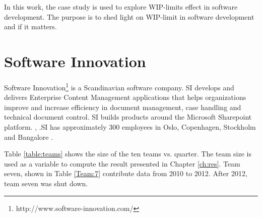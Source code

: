 \documentclass[UKenglish]{ifimaster}  %
\begin{document}
In this work, the case study is used to explore WIP-limits effect in software development. The purpose is to shed light on WIP-limit in software development and if it matters.

\section{Software Innovation}
\label{sec:SI}
Software Innovation\footnote{http://www.software-innovation.com/} is a Scandinavian software company. SI develops and delivers Enterprise Content Management applications that helps organizations improve and increase efficiency in document management, case handling and technical document control. SI builds products around the Microsoft Sharepoint platform. \parencite{Dag}, \parencite{SI}.SI has approximately 300 employees in Oslo, Copenhagen, Stockholm and Bangalore \parencite{SI}.

Table \ref{table:teams} shows the size of the ten teams vs. quarter. The team size is used as a variable to compute the result presented in Chapter \ref{ch:res}. Team seven, shown in Table \ref{Team:7} contribute data from 2010 to 2012. After 2012, team seven was shut down.
\end{document}
